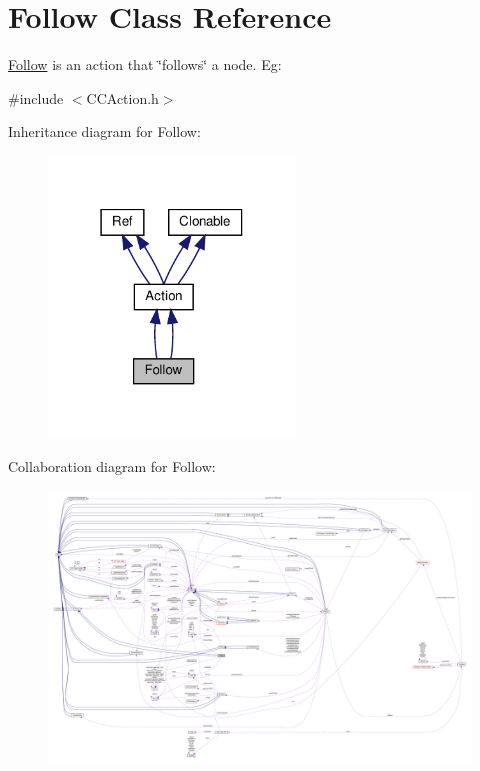 \hypertarget{classFollow}{}\section{Follow Class Reference}
\label{classFollow}


\hyperlink{classFollow}{Follow} is an action that \char`\"{}follows\char`\"{} a node. Eg\+:  




{\ttfamily \#include $<$C\+C\+Action.\+h$>$}



Inheritance diagram for Follow\+:
\nopagebreak
\begin{figure}[H]
\begin{center}
\leavevmode
\includegraphics[width=186pt]{classFollow__inherit__graph}
\end{center}
\end{figure}


Collaboration diagram for Follow\+:
\nopagebreak
\begin{figure}[H]
\begin{center}
\leavevmode
\includegraphics[width=350pt]{classFollow__coll__graph}
\end{center}
\end{figure}
